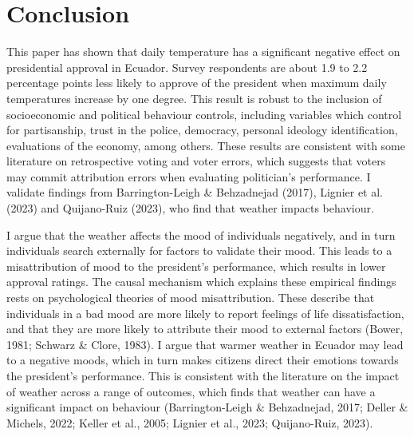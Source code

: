 \documentclass[
  12pt,
  letterpaper,
  DIV=11,
  numbers=noendperiod]{scrartcl}
\author{}
\date{}
\begin{document}
\section{Conclusion}\label{conclusion}

This paper has shown that daily temperature has a significant negative
effect on presidential approval in Ecuador. Survey respondents are about
1.9 to 2.2 percentage points less likely to approve of the president
when maximum daily temperatures increase by one degree. This result is
robust to the inclusion of socioeconomic and political behaviour
controls, including variables which control for partisanship, trust in
the police, democracy, personal ideology identification, evaluations of
the economy, among others. These results are consistent with some
literature on retrospective voting and voter errors, which suggests that
voters may commit attribution errors when evaluating politician's
performance. I validate findings from Barrington-Leigh \& Behzadnejad
(2017), Lignier et al. (2023) and Quijano-Ruiz (2023), who find that
weather impacts behaviour.

I argue that the weather affects the mood of individuals negatively, and
in turn individuals search externally for factors to validate their
mood. This leads to a misattribution of mood to the president's
performance, which results in lower approval ratings. The causal
mechanism which explains these empirical findings rests on psychological
theories of mood misattribution. These describe that individuals in a
bad mood are more likely to report feelings of life dissatisfaction, and
that they are more likely to attribute their mood to external factors
(Bower, 1981; Schwarz \& Clore, 1983). I argue that warmer weather in
Ecuador may lead to a negative moods, which in turn makes citizens
direct their emotions towards the president's performance. This is
consistent with the literature on the impact of weather across a range
of outcomes, which finds that weather can have a significant impact on
behaviour (Barrington-Leigh \& Behzadnejad, 2017; Deller \& Michels,
2022; Keller et al., 2005; Lignier et al., 2023; Quijano-Ruiz, 2023).
\end{document}
